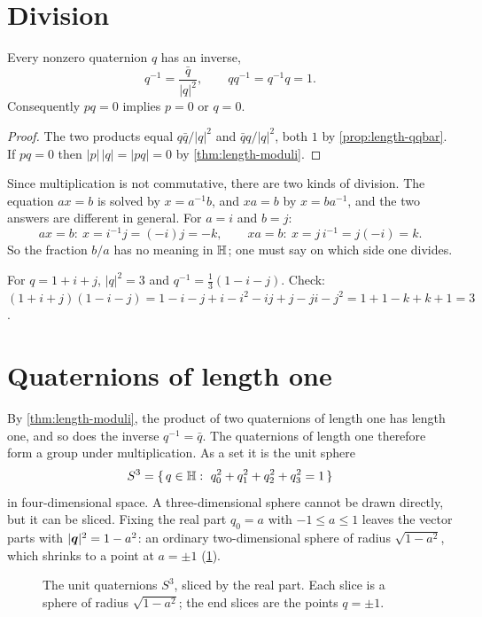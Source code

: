 \section{Division}

\begin{corollary}\label{cor:length-inverse}
Every nonzero quaternion $q$ has an inverse,
\[
  q^{-1}=\frac{\bar q}{|q|^2},\qquad qq^{-1}=q^{-1}q=1 .
\]
Consequently $pq=0$ implies $p=0$ or $q=0$.
\end{corollary}

\begin{proof}
The two products equal $q\bar q/|q|^2$ and $\bar q q/|q|^2$, both $1$ by \cref{prop:length-qqbar}. If $pq=0$ then $|p|\,|q|=|pq|=0$ by \cref{thm:length-moduli}.
\end{proof}

Since multiplication is not commutative, there are two kinds of division. The equation $ax=b$ is solved by $x=a^{-1}b$, and $xa=b$ by $x=ba^{-1}$, and the two answers are different in general. For $a=i$ and $b=j$:
\[
  ax=b:\ x=i^{-1}j=(-i)j=-k ,\qquad xa=b:\ x=j\,i^{-1}=j(-i)=k .
\]
So the fraction $b/a$ has no meaning in $\mathbb{H}$; one must say on which side one divides.

\begin{example}\label{ex:length-inverse}
For $q=1+i+j$, $|q|^2=3$ and $q^{-1}=\tfrac13(1-i-j)$. Check: $(1+i+j)(1-i-j)=1-i-j+i-i^2-ij+j-ji-j^2=1+1-k+k+1=3$.
\end{example}

\section{Quaternions of length one}

By \cref{thm:length-moduli}, the product of two quaternions of length one has length one, and so does the inverse $q^{-1}=\bar q$. The quaternions of length one therefore form a group under multiplication. As a set it is the unit sphere
\[
  S^3=\{\,q\in\HH:\ q_0^2+q_1^2+q_2^2+q_3^2=1\,\}
\]
in four-dimensional space. A three-dimensional sphere cannot be drawn directly, but it can be sliced. Fixing the real part $q_0=a$ with $-1\le a\le1$ leaves the vector parts with $|\bm{q}|^2=1-a^2$: an ordinary two-dimensional sphere of radius $\sqrt{1-a^2}$, which shrinks to a point at $a=\pm1$ (\cref{fig:length-s3}).

\begin{figure}[htbp]
  \centering
  \caption{The unit quaternions $S^3$, sliced by the real part. Each slice is a sphere of radius $\sqrt{1-a^2}$; the end slices are the points $q=\pm1$.}
  \label{fig:length-s3}
\end{figure}

